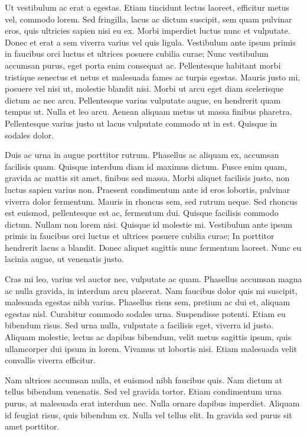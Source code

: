 \documentclass{homework}
\begin{document}
Ut vestibulum ac erat a egestas. Etiam tincidunt lectus laoreet, efficitur metus vel, commodo lorem. Sed fringilla, lacus ac dictum suscipit, sem quam pulvinar eros, quis ultricies sapien nisi eu ex. Morbi imperdiet luctus nunc et vulputate. Donec et erat a sem viverra varius vel quis ligula. Vestibulum ante ipsum primis in faucibus orci luctus et ultrices posuere cubilia curae; Nunc vestibulum accumsan purus, eget porta enim consequat ac. Pellentesque habitant morbi tristique senectus et netus et malesuada fames ac turpis egestas. Mauris justo mi, posuere vel nisi ut, molestie blandit nisi. Morbi ut arcu eget diam scelerisque dictum ac nec arcu. Pellentesque varius vulputate augue, eu hendrerit quam tempus ut. Nulla et leo arcu. Aenean aliquam metus ut massa finibus pharetra. Pellentesque varius justo ut lacus vulputate commodo ut in est. Quisque in sodales dolor.

Duis ac urna in augue porttitor rutrum. Phasellus ac aliquam ex, accumsan facilisis quam. Quisque interdum diam id maximus dictum. Fusce enim quam, gravida ac mattis sit amet, finibus sed massa. Morbi aliquet facilisis justo, non luctus sapien varius non. Praesent condimentum ante id eros lobortis, pulvinar viverra dolor fermentum. Mauris in rhoncus sem, sed rutrum neque. Sed rhoncus est euismod, pellentesque est ac, fermentum dui. Quisque facilisis commodo dictum. Nullam non lorem nisi. Quisque id molestie mi. Vestibulum ante ipsum primis in faucibus orci luctus et ultrices posuere cubilia curae; In porttitor hendrerit lacus a blandit. Donec aliquet sagittis nunc fermentum laoreet. Nunc eu lacinia augue, ut venenatis justo.

Cras mi leo, varius vel auctor nec, vulputate ac quam. Phasellus accumsan magna ac nulla gravida, in interdum arcu placerat. Nam faucibus dolor quis mi suscipit, malesuada egestas nibh varius. Phasellus risus sem, pretium ac dui et, aliquam egestas nisl. Curabitur commodo sodales urna. Suspendisse potenti. Etiam eu bibendum risus. Sed urna nulla, vulputate a facilisis eget, viverra id justo. Aliquam molestie, lectus ac dapibus bibendum, velit metus sagittis ipsum, quis ullamcorper dui ipsum in lorem. Vivamus ut lobortis nisi. Etiam malesuada velit convallis viverra efficitur.

Nam ultrices accumsan nulla, et euismod nibh faucibus quis. Nam dictum at tellus bibendum venenatis. Sed vel gravida tortor. Etiam condimentum urna purus, at malesuada erat interdum nec. Nulla ornare dapibus imperdiet. Aliquam id feugiat risus, quis bibendum ex. Nulla vel tellus elit. In gravida sed purus sit amet porttitor.
\end{document}
